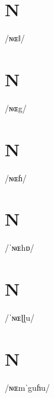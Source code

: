 \documentclass[10pt,a4paper,twoside]{book}
\begin{document}
\section*{N}

\begin{multicols}{3}
 {/ɴɶǁ/} {}
\end{multicols}

\section*{N}

\begin{multicols}{3}
 {/ɴɶg/} {}
\end{multicols}

\section*{N}

\begin{multicols}{3}
 {/ɴɶɦ/} {}
\end{multicols}

\section*{N}

\begin{multicols}{3}
 {/ˈɴɶhɒ/} {}
\end{multicols}

\section*{N}

\begin{multicols}{3}
 {/ˈɴɶɭɭu/} {}
\end{multicols}

\section*{N}

\begin{multicols}{3}
 {/ɴɶmˈguɦu/} {}
\end{multicols}
\end{document}
